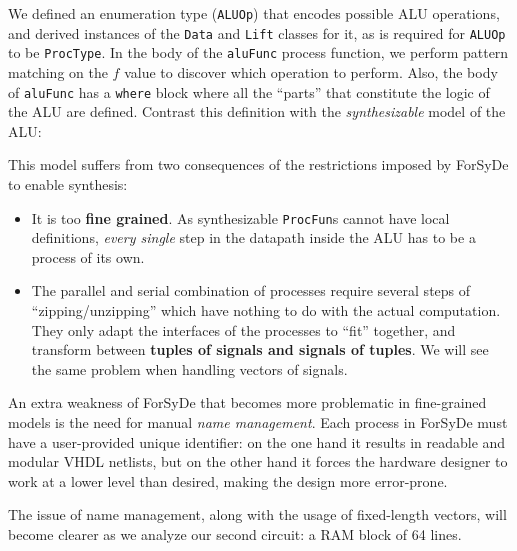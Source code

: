 \documentclass[a4paper]{article}
\begin{document}
                We defined an enumeration type (\texttt{ALUOp}) that encodes possible ALU
                operations, and derived instances of the \texttt{Data} and \texttt{Lift} classes for
                it, as is required for \texttt{ALUOp} to be \texttt{ProcType}. In the body of the
                \texttt{aluFunc} process function, we perform pattern matching on the $f$ value to
                discover which operation to perform. Also, the body of \texttt{aluFunc} has a
                \texttt{where} block where all the ``parts'' that constitute the logic of the ALU
                are defined. Contrast this definition with the \emph{synthesizable} model of the
                ALU:


                This model suffers from two consequences of the restrictions imposed by ForSyDe to
                enable synthesis:

                \begin{itemize}
                    \item It is too \textbf{fine grained}. As synthesizable \texttt{ProcFun}s cannot
                        have local definitions, \emph{every single} step in the datapath inside the
                        ALU has to be a process of its own.

                    \item The parallel and serial combination of processes require several steps of
                        ``zipping/unzipping'' which have nothing to do with the actual computation.
                        They only adapt the interfaces of the processes to ``fit'' together, and
                        transform between \textbf{tuples of signals and signals of tuples}. We will
                        see the same problem when handling vectors of signals.
                \end{itemize}

                An extra weakness of ForSyDe that becomes more problematic in fine-grained models is
                the need for manual \emph{name management}. Each process in ForSyDe must have a
                user-provided unique identifier: on the one hand it results in readable and modular
                VHDL netlists, but on the other hand it forces the hardware designer to work at a
                lower level than desired, making the design more error-prone.

                The issue of name management, along with the usage of fixed-length vectors, will
                become clearer as we analyze our second circuit: a RAM block of 64 lines.
\end{document}
